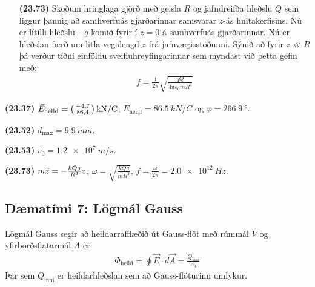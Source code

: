 \ifdefined \wholebook \else\documentclass[oneside]{book}\usepackage{EdlBook}\graphicspath{{figures/}}
\begin{document}
\begin{enumerate}[label = \textbf{(\alph*)}]
\item[\textbf{(23.73)}] Skoðum hringlaga gjörð með geisla $R$ og jafndreifða hleðslu $Q$ sem liggur þannig að samhverfuás gjarðarinnar samsvarar $z$-ás hnitakerfisins. Nú er lítilli hleðslu $-q$ komið fyrir í $z = 0$ á samhverfuás gjarðarinnar. Nú er hleðslan færð um litla vegalengd $z$ frá jafnvægisstöðunni. Sýnið að fyrir $z \ll R$ þá verður tíðni einföldu sveifluhreyfingarinnar sem myndast við þetta gefin með:
\begin{align*}
    f = \frac{1}{2\pi} \sqrt{\frac{qQ}{4\pi \varepsilon_0 m R^3}}
\end{align*}

\end{enumerate}

\begin{tcolorbox}
\begin{enumerate*}[label = \vspace{0.15cm} ]
  \item \textbf{(23.37)} $\vec{E}_{\text{heild}} = \smqty(-4,7 \\ 86,4) \, \si{kN/C}$, $E_{\text{heild}} = \SI{86.5}{kN/C}$ og $\varphi = \SI{266.9}{\degree}$.
  \item \textbf{(23.52)} $d_{\text{max}} = \SI{9.9}{mm}$.
  \item \textbf{(23.53)} $v_0 = \SI{1.2e7}{m/s}$.
  \item \textbf{(23.73)} $m\Ddot{z} = - \frac{kQq}{R^3}z$, $\omega = \sqrt{\frac{kQq}{mR^3}}$, $f = \frac{\omega}{2\pi} = \SI{2.0e12}{Hz}$.
\end{enumerate*}
\end{tcolorbox}

\newpage

\subsection*{Dæmatími 7: Lögmál Gauss}


\begin{tcolorbox}
Lögmál Gauss segir að heildarrafflæðið út Gauss-flöt með rúmmál $V$ og yfirborðsflatarmál $A$ er:
\begin{align*}
    \Phi_{\text{heild}} = \oint \vec{E} \cdot d\vec{A} = \frac{Q_{\text{inni}}}{\varepsilon_0}
\end{align*}
Þar sem $Q_{\text{inni}}$ er heildarhleðslan sem að Gauss-flöturinn umlykur.
\end{tcolorbox}
\end{document}
